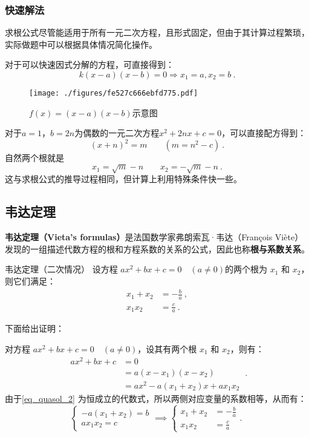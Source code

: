 \subsubsection{快速解法}

求根公式尽管能适用于所有一元二次方程，且形式固定，但由于其计算过程繁琐，实际做题中可以根据具体情况简化操作。

对于可以快速因式分解的方程，可直接得到：
$$k(x-a)(x-b)=0\Rightarrow x_1=a, x_2=b~.$$
\begin{figure}[ht]
\centering
\texttt{[image: ./figures/fe527c666ebfd775.pdf]}
\caption{$f(x)=(x-a)(x-b)$示意图} \label{fig_quasol_2}
\end{figure}

对于$a=1$，$b=2n$为偶数的一元二次方程$x^2+2nx+c=0$，可以直接配方得到：
\begin{equation}
(x+n)^2=m\qquad(m=n^2-c)~.
\end{equation}
自然两个根就是
\begin{equation}
x_1=\sqrt{m}-n\qquad x_2=-\sqrt{m}-n~.
\end{equation}
这与求根公式的推导过程相同，但计算上利用特殊条件快一些。

\subsection{韦达定理}

\textbf{韦达定理（Vieta's formulas）}是法国数学家弗朗索瓦·韦达（François Viète）发现的一组描述代数方程的根和方程系数的关系的公式，因此也称\textbf{根与系数关系}。

\begin{theorem}{韦达定理（二次情况）}
设方程 $a x^2 + b x + c = 0\quad(a \neq 0)$的两个根为 $x_1$ 和 $x_2$，则它们满足：
$$\begin{aligned}
x_1 + x_2 &= -\frac{b}{a} ~,\\
x_1 x_2 &= \frac{c}{a}~.
\end{aligned}$$
\end{theorem}

下面给出证明：

对方程 $a x^2 + b x + c = 0\quad(a \neq 0)$，设其有两个根 $x_1$ 和 $x_2$，则有：
\begin{equation}\label{eq_quasol_2}
\begin{split}
ax^2+bx+c &= 0 \\ 
&=a(x-x_1)(x-x_2)\\
&=ax^2-a(x_1+x_2)x+ax_1x_2
\end{split}~.
\end{equation}
由于\autoref{eq_quasol_2} 为恒成立的代数式，所以两侧对应变量的系数相等，从而有：
\begin{equation}
\begin{cases}
-a(x_1+x_2)=b\\
ax_1x_2=c
\end{cases}
\implies
\begin{cases}
x_1 + x_2 &= \displaystyle-\frac{b}{a} \\
x_1 x_2 &= \displaystyle\frac{c}{a}
\end{cases}.~
\end{equation}

